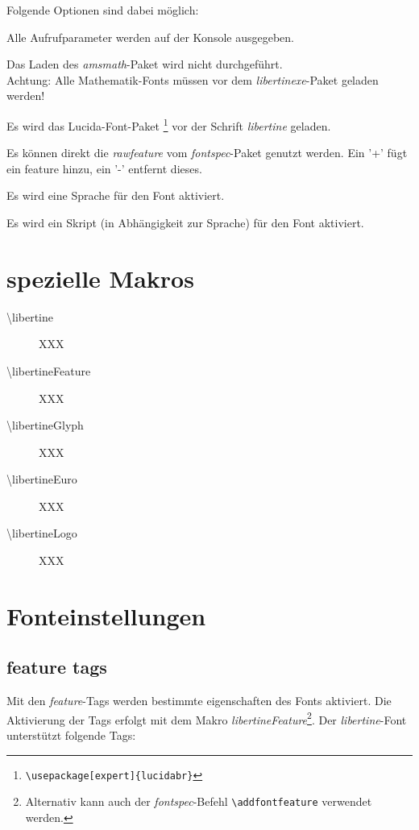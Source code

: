 \documentclass{fontdoku}
\begin{document}
Folgende Optionen sind dabei möglich:
\begin{description}
\item [debug] Alle Aufrufparameter werden auf der Konsole ausgegeben.
\item [noamsmath] Das Laden des \emph{amsmath}-Paket wird nicht durchgeführt.\\
      Achtung: Alle Mathematik-Fonts müssen vor dem \emph{libertinexe}-Paket
      geladen werden!
\item [lucida] Es wird das Lucida-Font-Paket%
      \footnote{\texttt{\textbackslash usepackage[expert]\{lucidabr\}}}
      vor der Schrift \emph{libertine} geladen.
\item [rawfeature] Es können direkt die \emph{rawfeature} vom \emph{fontspec}-Paket genutzt werden.
      Ein '+' fügt ein feature hinzu, ein '-' entfernt dieses.
\item [langauge] Es wird eine Sprache für den Font aktiviert.
\item [script]   Es wird ein Skript (in Abhängigkeit zur Sprache) für den Font aktiviert.
\end{description}

\section{spezielle Makros}

\begin{description}
\item [\textbackslash libertine] XXX
\item [\textbackslash libertineFeature] XXX
\item [\textbackslash libertineGlyph] XXX
\item [\textbackslash libertineEuro] XXX
\item [\textbackslash libertineLogo] XXX
\end{description}


\newpage
\section{Fonteinstellungen}

\subsection{feature tags}

Mit den \emph{feature}-Tags werden bestimmte eigenschaften des Fonts aktiviert.
Die Aktivierung der Tags erfolgt mit dem Makro \emph{libertineFeature}\footnote{Alternativ kann auch der \emph{fontspec}-Befehl \texttt{\textbackslash addfontfeature} verwendet werden.}.
Der \emph{libertine}-Font unterstützt folgende Tags:%
\end{document}
